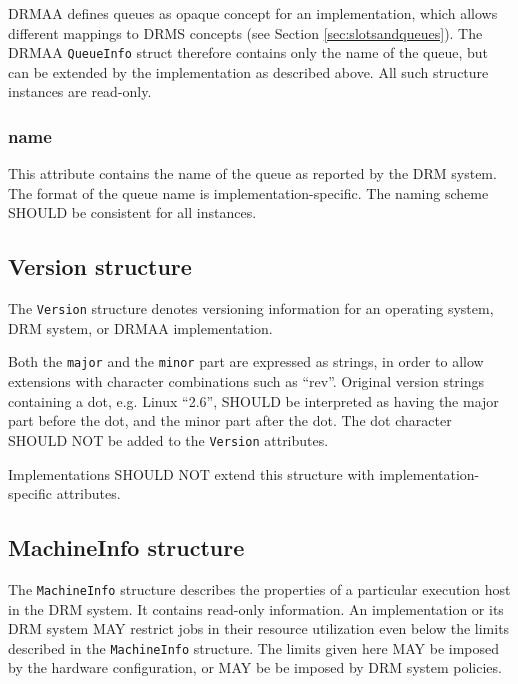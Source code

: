 \documentclass{article}
\newcommand{\h}[1]{\lstinline|#1|}
\newcommand{\rat}[1]{}
\begin{document}
DRMAA defines queues as opaque concept for an implementation, which allows different mappings to DRMS concepts (see Section \ref{sec:slotsandqueues}). The DRMAA \h{QueueInfo} struct therefore contains only the name of the queue, but can be extended by the implementation as described above. All such structure instances are read-only.



\subsubsection{name}

This attribute contains the name of the queue as reported by the DRM system. The format of the queue name is implementation-specific. The naming scheme SHOULD be consistent for all instances.

\subsection{Version structure}
\label{sec:version}

The \h{Version} structure denotes versioning information for an operating system, DRM system, or DRMAA implementation. 



Both the \h{major} and the \h{minor} part are expressed as strings, in order to allow extensions with character combinations such as \enquote{rev}. Original version strings containing a dot, e.g. Linux \enquote{2.6}, SHOULD be interpreted as having the major part before the dot, and the minor part after the dot. The dot character SHOULD NOT be added to the \h{Version} attributes. 

Implementations SHOULD NOT extend this structure with implementation-specific attributes.

\rat{
We could see no use case in doing implementation-specific extensions here, so this structure is not considered in DrmaaReflective. Another reason is that versioning information may be used for control flow decisions. Therefore, it should be portable in any case. 
}

\subsection{MachineInfo structure}
\label{sec:machine}

The \h{MachineInfo} structure describes the properties of a particular execution host in the DRM system. It contains read-only information. An implementation or its DRM system MAY restrict jobs in their resource utilization even below the limits described in the \h{MachineInfo} structure. The limits given here MAY be imposed by the hardware configuration, or MAY be be imposed by DRM system policies.
\end{document}
